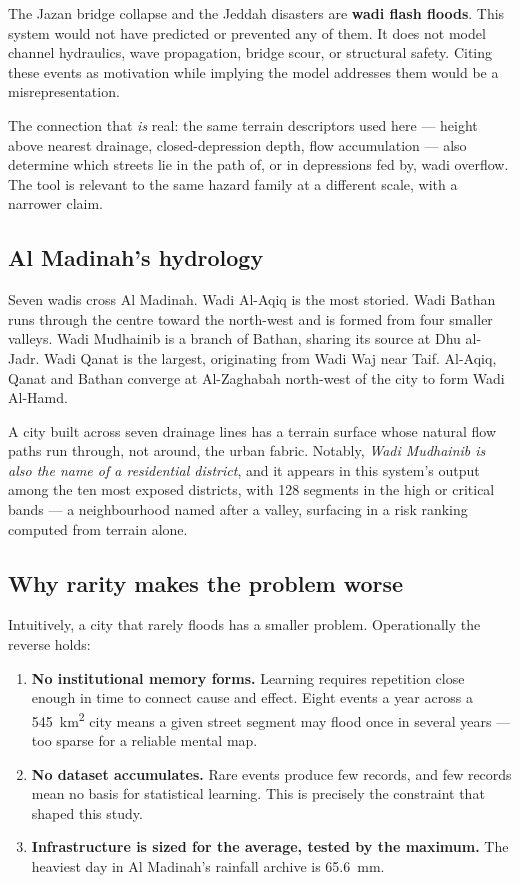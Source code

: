 \documentclass[11pt,a4paper]{article}
\begin{document}
\begin{trapbox}
The Jazan bridge collapse and the Jeddah disasters are \textbf{wadi flash floods}. This
system would not have predicted or prevented any of them. It does not model channel
hydraulics, wave propagation, bridge scour, or structural safety. Citing these events as
motivation while implying the model addresses them would be a misrepresentation.

The connection that \emph{is} real: the same terrain descriptors used here --- height
above nearest drainage, closed-depression depth, flow accumulation --- also determine
which streets lie in the path of, or in depressions fed by, wadi overflow. The tool is
relevant to the same hazard family at a different scale, with a narrower claim.
\end{trapbox}

\subsection{Al Madinah's hydrology}
Seven wadis cross Al Madinah. Wadi Al-Aqiq is the most storied. Wadi Bathan runs through
the centre toward the north-west and is formed from four smaller valleys. Wadi Mudhainib
is a branch of Bathan, sharing its source at Dhu al-Jadr. Wadi Qanat is the largest,
originating from Wadi Waj near Taif. Al-Aqiq, Qanat and Bathan converge at Al-Zaghabah
north-west of the city to form Wadi Al-Hamd.

A city built across seven drainage lines has a terrain surface whose natural flow paths
run through, not around, the urban fabric. Notably, \emph{Wadi Mudhainib is also the name
of a residential district}, and it appears in this system's output among the ten most
exposed districts, with 128 segments in the high or critical bands --- a neighbourhood
named after a valley, surfacing in a risk ranking computed from terrain alone.

\subsection{Why rarity makes the problem worse}
Intuitively, a city that rarely floods has a smaller problem. Operationally the reverse
holds:

\begin{enumerate}
  \item \textbf{No institutional memory forms.} Learning requires repetition close enough
        in time to connect cause and effect. Eight events a year across a
        \SI{545}{\kilo\metre\squared} city means a given street segment may flood once in
        several years --- too sparse for a reliable mental map.
  \item \textbf{No dataset accumulates.} Rare events produce few records, and few records
        mean no basis for statistical learning. This is precisely the constraint that
        shaped this study.
  \item \textbf{Infrastructure is sized for the average, tested by the maximum.} The
        heaviest day in Al Madinah's rainfall archive is \SI{65.6}{\milli\metre}.
\end{enumerate}
\end{document}
